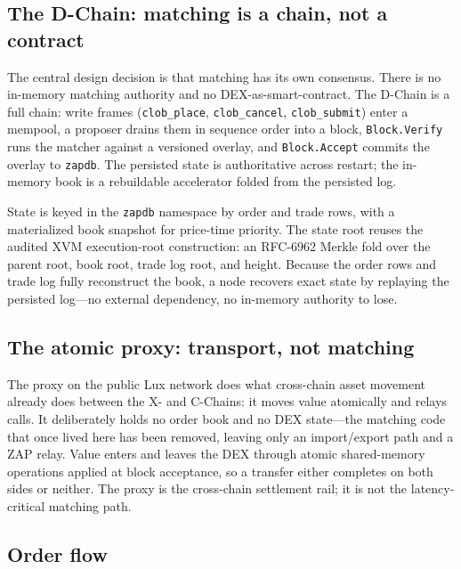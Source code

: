 \subsection{The D-Chain: matching is a chain, not a contract}

The central design decision is that matching has its own consensus. There is no
in-memory matching authority and no DEX-as-smart-contract. The D-Chain is a full
chain: write frames (\texttt{clob\_place}, \texttt{clob\_cancel}, \texttt{clob\_submit})
enter a mempool, a proposer drains them in sequence order into a block,
\texttt{Block.Verify} runs the matcher against a versioned overlay, and
\texttt{Block.Accept} commits the overlay to \texttt{zapdb}. The persisted state is
authoritative across restart; the in-memory book is a rebuildable accelerator folded
from the persisted log.

State is keyed in the \texttt{zapdb} namespace by order and trade rows, with a
materialized book snapshot for price-time priority. The state root reuses the audited
XVM execution-root construction: an RFC-6962 Merkle fold over the parent root, book
root, trade log root, and height. Because the order rows and trade log fully
reconstruct the book, a node recovers exact state by replaying the persisted log---no
external dependency, no in-memory authority to lose.

\subsection{The atomic proxy: transport, not matching}

The proxy on the public Lux network does what cross-chain asset movement already does
between the X- and C-Chains: it moves value atomically and relays calls. It deliberately
holds no order book and no DEX state---the matching code that once lived here has been
removed, leaving only an import/export path and a ZAP relay. Value enters and leaves the
DEX through atomic shared-memory operations applied at block acceptance, so a transfer
either completes on both sides or neither. The proxy is the cross-chain settlement rail;
it is not the latency-critical matching path.

\subsection{Order flow}

